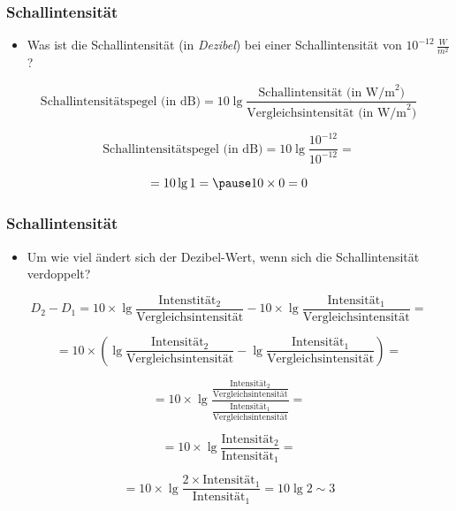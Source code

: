 \documentclass{beamer}
\begin{document}
\begin{frame}
\frametitle{Schallintensität}

\begin{itemize}
\item
Was ist die Schallintensität (in \emph{Dezibel}) bei einer Schallintensität von \(10^{-12}\,\frac{W}{m^2}\)?

\end{itemize}

\[
\text{Schallintensitätspegel (in dB)} = 10 \lg \frac{\text{Schallintensität (in W/m}^2\text{)}}{\text{Vergleichsintensität (in W/m}^2\text{)}} 
\]


\[
\text{Schallintensitätspegel (in dB)} = 10 \lg \frac{10^{-12}}{10^{-12}}  = 
\]

\pause
\[
= 10 \lg 1 = \pause 10\times 0 = 0
\]


\end{frame}


\begin{frame}
\frametitle{Schallintensität}


\begin{itemize}
\item
Um wie viel ändert sich der Dezibel-Wert, wenn sich die Schallintensität verdoppelt?
\end{itemize}

\[
D_2 - D_1 = 10\times \lg \frac{\text{Intenstität}_2}{\text{Vergleichsintensität}} - 10\times \lg \frac{\text{Intensität}_1}{\text{Vergleichsintensität}} =
\]

\pause


\[
= 10 \times \left( \lg \frac{\text{Intensität}_2}{\text{Vergleichsintensität}} -  \lg \frac{\text{Intensität}_1}{\text{Vergleichsintensität}} \right)  =
\]

\pause


\[
= 10 \times \lg \frac{\frac{\text{Intensität}_2}{\text{Vergleichsintensität}}}{\frac{\text{Intensität}_1}{\text{Vergleichsintensität}}} =
\]

\pause


\[
= 10 \times \lg \frac{\text{Intensität}_2}{\text{Intensität}_1} =
\]

\pause


\[
= 10 \times \lg  \frac{2\times \text{Intensität}_1}{\text{Intensität}_1} = 10 \lg 2 \sim 3
\]


\end{frame}




\end{document}

